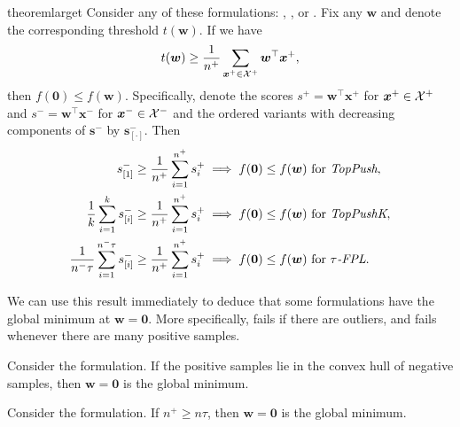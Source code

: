 \begin{restatable}{theorem}{larget}\label{thm:large_t}
  Consider any of these formulations: \TopPush, \TopPushK, \TopMeanK or \tauFPL. Fix any $\bm{w}$ and denote the corresponding threshold $t(\bm{w})$. If we have
  \begin{equation*}
    t(\bm{w})\ge \frac{1}{n^+} \sum_{\bm{x}^+ \in \mathcal{X}^+} \bm{w}^\top \bm{x}^+,
  \end{equation*}
  then $f(\bm{0})\le f(\bm{w})$. Specifically, denote the scores $s^+=\bm{w}^\top \bm{x}^+$ for $\bm{x}^+\in \mathcal{X}^+$ and $s^-=\bm{w}^\top \bm{x}^-$ for $\bm{x}^-\in \mathcal{X}^-$ and the ordered variants with decreasing components of $\bm{s}^-$ by $\bm{s}_{[\cdot]}^-$. Then
  \begin{equation}\label{eq:w_zero}
    \begin{aligned}
    s_{[1]}^- \ge \frac{1}{n^+} \sum_{i=1}^{n^+} s_{i}^+
    & \implies f(\bm{0}) \le f(\bm{w}) \text{ for } \emph{TopPush}, \\
    \frac{1}{k}\sum_{i=1}^k s_{[i]}^- \ge \frac{1}{n^+} \sum_{i=1}^{n^+} s_{i}^+
    & \implies f(\bm{0})\le f(\bm{w}) \text{ for } \emph{TopPushK}, \\
    \frac{1}{n^-\tau} \sum_{i=1}^{n^-\tau} s_{[i]}^- \ge \frac{1}{n^+}\sum_{i=1}^{n^+} s_{i}^+
    & \implies f(\bm{0}) \le f(\bm{w}) \text{ for } {\emph{$\tau$-FPL}}. \\
    \end{aligned}
  \end{equation}
\end{restatable}

We can use this result immediately to deduce that some formulations have the global minimum at $\bm{w} = \bm{0}$. More specifically, \TopPush fails if there are outliers, and \TopMeanK fails whenever there are many positive samples.

\begin{corollary}\label{cor:toppush}
  Consider the \TopPush formulation. If the positive samples lie in the convex hull of negative samples, then $\bm{w}=\bm{0}$ is the global minimum.
\end{corollary}

\begin{corollary}\label{cor:topmean}
  Consider the \TopMeanK formulation. If $n^+\ge n\tau$, then $\bm{w}=\bm{0}$ is the global minimum.
\end{corollary}

